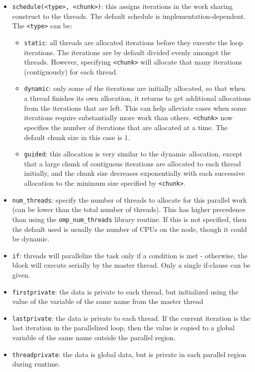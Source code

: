 \documentclass[10pt]{article}
\newcounter{subsubsubsection}[subsubsection]
\begin{document}
\begin{flushleft}

\begin{itemize}
\item {\tt schedule(<type>, <chunk>)}: this assigns iterations in the work sharing construct to the threads. The default schedule is implementation-dependent. The {\tt <type>} can be:
	\begin{itemize}
		\item {\tt static}: all threads are allocated iterations before they execute the loop iterations. The iterations are by default divided evenly amongst the threads. However, specifying {\tt <chunk>} will allocate that many iterations (contiguously) for each thread.
		\item {\tt dynamic}: only some of the iterations are initially allocated, so that when a thread finishes its own allocation, it returns to get additional allocations from the iterations that are left. This can help alleviate cases when some iterations require substantially more work than others. {\tt <chunk>} now specifies the number of iterations that are allocated at a time. The default chunk size in this case is 1.
		\item {\tt guided}: this allocation is very similar to the dynamic allocation, except that a large chunk of contiguous iterations are allocated to each thread initially, and the chunk size decreases exponentially with each successive allocation to the minimum size specified by {\tt <chunk>}.
	\end{itemize}
\item {\tt num\_threads}: specify the number of threads to allocate for this parallel work (can be lower than the total number of threads). This has higher precedence than using the {\tt omp\_num\_threads} library routine. If this is not specified, then the default used is usually the number of CPUs on the node, though it could be dynamic. 
\end{itemize}


\begin{itemize}
\item {\tt if}: threads will parallelize the task only if a condition is met - otherwise, the block will execute serially by the master thread. Only a single if-clause can be given. 
\end{itemize}


\begin{itemize}
\item {\tt firstprivate}: the data is private to each thread, but initialized using the value of the variable of the same name from the master thread
\item {\tt lastprivate}: the data is private to each thread. If the current iteration is the last iteration in the parallelized loop, then the value is copied to a global variable of the same name outside the parallel region.
\item {\tt threadprivate}: the data is global data, but is private in each parallel region during runtime. 
\end{itemize}


\end{flushleft}
\end{document}

